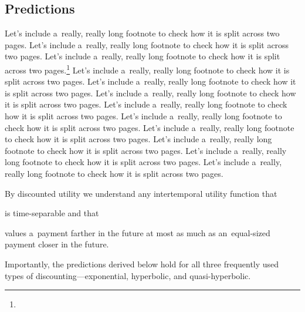 


\subsection{Predictions}
\label{sec:Predictions}

\blindtext

Let's include a~really, really long footnote to check how it is split across two pages. Let's include a~really, really long footnote to check how it is split across two pages. Let's include a~really, really long footnote to check how it is split across two pages.\footnote{\blindmathfalse\blindtext[7]\blindmathtrue} Let's include a~really, really long footnote to check how it is split across two pages. Let's include a~really, really long footnote to check how it is split across two pages. Let's include a~really, really long footnote to check how it is split across two pages. Let's include a~really, really long footnote to check how it is split across two pages. Let's include a~really, really long footnote to check how it is split across two pages. Let's include a~really, really long footnote to check how it is split across two pages. Let's include a~really, really long footnote to check how it is split across two pages. Let's include a~really, really long footnote to check how it is split across two pages. Let's include a~really, really long footnote to check how it is split across two pages.

By discounted utility we understand any intertemporal utility function that
\begin{enumerate*}
\item is time-separable and that
\item values a~payment farther in the future at most as much as an~equal-sized payment closer in the future.
\end{enumerate*}
Importantly, the predictions derived below hold for all three frequently used types of discounting---exponential, hyperbolic, and quasi-hyperbolic.

